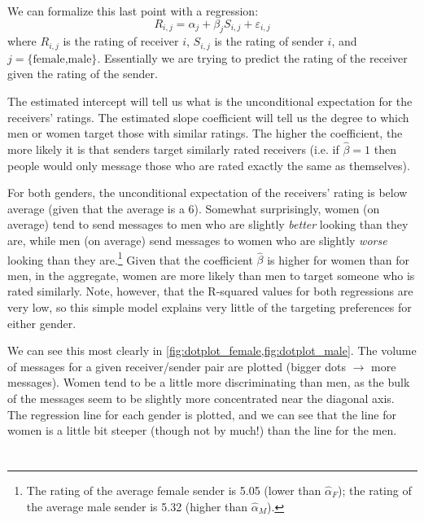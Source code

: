 We can formalize this last point with a regression:
\[ R_{i,j} = \alpha_j + \beta_j S_{i,j} + \varepsilon_{i,j} \]
where $R_{i,j}$ is the rating of receiver $i$, $S_{i,j}$ is the rating of sender $i$, and $j=\text{\{female,male\}}$. Essentially we are trying to predict the rating of the receiver given the rating of the sender.

The estimated intercept will tell us what is the unconditional expectation for the receivers' ratings. The estimated slope coefficient will tell us the degree to which men or women target those with similar ratings. The higher the coefficient, the more likely it is that senders target similarly rated receivers (i.e. if $\hat{\beta}=1$ then people would only message those who are rated exactly the same as themselves).



For both genders, the unconditional expectation of the receivers' rating is below average (given that the average is a 6). Somewhat surprisingly, women (on average) tend to send messages to men who are slightly \textit{better} looking than they are, while men (on average) send messages to women who are slightly \textit{worse} looking than they are.\footnote{The rating of the average female sender is 5.05 (lower than $\hat{\alpha}_{F}$); the rating of the average male sender is 5.32 (higher than $\hat{\alpha}_{M}$).} Given that the coefficient $\hat{\beta}$ is higher for women than for men, in the aggregate, women are more likely than men to target someone who is rated similarly. Note, however, that the R-squared values for both regressions are very low, so this simple model explains very little of the targeting preferences for either gender.

We can see this most clearly in \vref{fig:dotplot_female,fig:dotplot_male}. The volume of messages for a given receiver/sender pair are plotted (bigger dots $\rightarrow$ more messages). Women tend to be a little more discriminating than men, as the bulk of the messages seem to be slightly more concentrated near the diagonal axis. The regression line for each gender is plotted, and we can see that the line for women is a little bit steeper (though not by much!) than the line for the men.




\section{}

